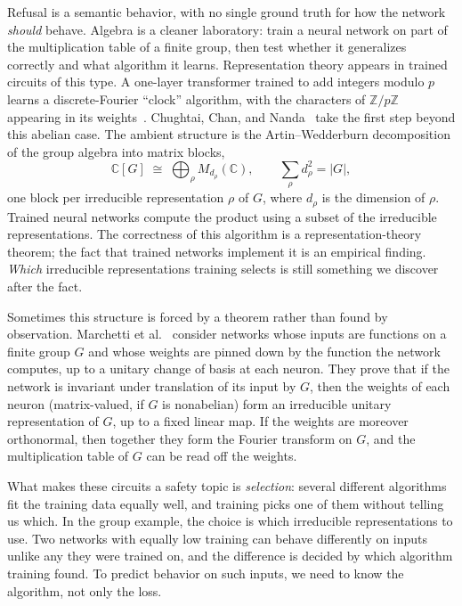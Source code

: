 Refusal is a semantic behavior, with no single ground truth for how the network \emph{should} behave. Algebra is a cleaner laboratory: train a neural network on part of the multiplication table of a finite group, then test whether it generalizes correctly and what algorithm it learns. Representation theory appears in trained circuits of this type. A one-layer transformer trained to add integers modulo $p$ learns a discrete-Fourier ``clock'' algorithm, with the characters of $\mathbb{Z}/p\mathbb{Z}$ appearing in its weights~\cite{nanda2023}. Chughtai, Chan, and Nanda~\cite{chughtai2023} take the first step beyond this abelian case. The ambient structure is the Artin--Wedderburn decomposition of the group algebra into matrix blocks,
\[
   \mathbb{C}[G]\;\cong\;\bigoplus_{\rho} M_{d_\rho}(\mathbb{C}),
   \qquad \sum_{\rho} d_\rho^{2}=\lvert G\rvert,
\]
one block per irreducible representation $\rho$ of $G$, where $d_\rho$ is the dimension of $\rho$. Trained neural networks compute the product using a subset of the irreducible representations. The correctness of this algorithm is a representation-theory theorem; the fact that trained networks implement it is an empirical finding. \emph{Which} irreducible representations training selects is still something we discover after the fact.

Sometimes this structure is forced by a theorem rather than found by observation. Marchetti et al.~\cite{marchetti2024} consider networks whose inputs are functions on a finite group $G$ and whose weights are pinned down by the function the network computes, up to a unitary change of basis at each neuron. They prove that if the network is invariant under translation of its input by $G$, then the weights of each neuron (matrix-valued, if $G$ is nonabelian) form an irreducible unitary representation of $G$, up to a fixed linear map. If the weights are moreover orthonormal, then together they form the Fourier transform on $G$, and the multiplication table of $G$ can be read off the weights.

What makes these circuits a safety topic is \emph{selection}: several different algorithms fit the training data equally well, and training picks one of them without telling us which. In the group example, the choice is which irreducible representations to use. Two networks with equally low training  can behave differently on inputs unlike any they were trained on, and the difference is decided by which algorithm training found. To predict behavior on such inputs, we need to know the algorithm, not only the loss.

